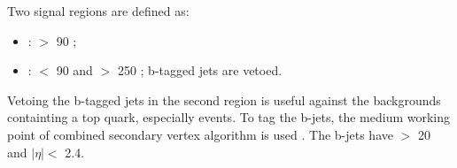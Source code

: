 Two signal regions are defined as:
\begin{itemize}
\item {\bf\binone}: \mttwo $>$ 90 \GeV;
\item {\bf\bintwo}: \mttwo $<$ 90 \GeV and \SumMT $>$ 250 \GeV; b-tagged jets are vetoed.
\end{itemize}
Vetoing the b-tagged jets in the second region is useful against the backgrounds containting a top quark, especially \ttbar events. 
To tag the b-jets, the medium working point of combined secondary vertex algorithm is used \cite{Chatrchyan:2012jua}. The b-jets have
\PT $>$ 20 \GeV and $|\eta| < $ 2.4.

